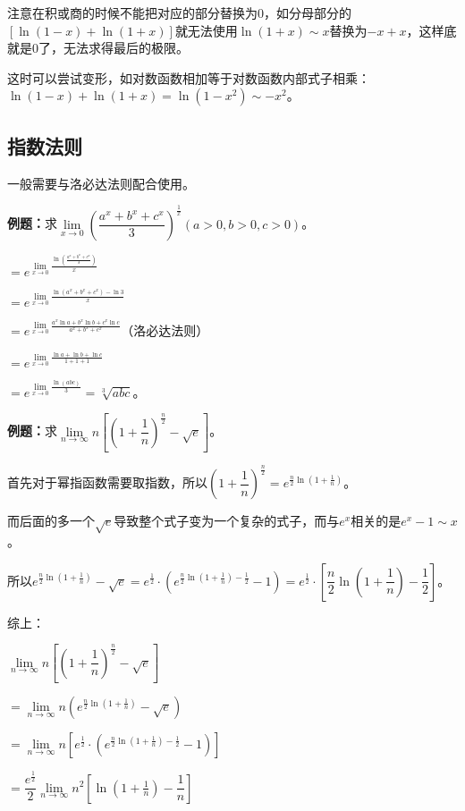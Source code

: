 \documentclass[UTF8, 12pt]{ctexart}
\begin{document}
注意在积或商的时候不能把对应的部分替换为0，如分母部分的$[\ln(1-x)+\ln(1+x)]$就无法使用$\ln(1+x)\sim x$替换为$-x+x$，这样底就是0了，无法求得最后的极限。

这时可以尝试变形，如对数函数相加等于对数函数内部式子相乘：$\ln(1-x)+\ln(1+x)=\ln(1-x^2)\sim-x^2$。

\subsection{指数法则}

一般需要与洛必达法则配合使用。

\textbf{例题：}求$\lim\limits_{x\to 0}\left(\dfrac{a^x+b^x+c^x}{3}\right)^{\frac{1}{x}}(a>0,b>0,c>0)$。\medskip

$=e^{\lim\limits_{x\to 0}\frac{\ln\left(\frac{a^x+b^x+c^x}{3}\right)}{x}}$

$=e^{\lim\limits_{x\to 0}\frac{\ln(a^x+b^x+c^x)-\ln 3}{x}}$

$=e^{\lim\limits_{x\to 0}\frac{a^x\ln a+b^x\ln b+c^x\ln c}{a^x+b^x+c^x}}$（洛必达法则）

$=e^{\lim\limits_{x\to 0}\frac{\ln a+\ln b+\ln c}{1+1+1}}$

$=e^{\lim\limits_{x\to 0}\frac{\ln(abc)}{3}}=\sqrt[3]{abc}$。

\textbf{例题：}求$\lim\limits_{n\to\infty}n\left[\left(1+\dfrac{1}{n}\right)^{\frac{n}{2}}-\sqrt{e}\right]$。

首先对于幂指函数需要取指数，所以$\left(1+\dfrac{1}{n}\right)^{\frac{n}{2}}=e^{\frac{n}{2}\ln(1+\frac{1}{n})}$。\medskip

而后面的多一个$\sqrt{e}$导致整个式子变为一个复杂的式子，而与$e^x$相关的是$e^x-1\sim x$。

所以$e^{\frac{n}{2}\ln(1+\frac{1}{n})}-\sqrt{e}=e^{\frac{1}{2}}\cdot\left(e^{\frac{n}{2}\ln(1+\frac{1}{n})-\frac{1}{2}}-1\right)=e^{\frac{1}{2}}\cdot\left[\dfrac{n}{2}\ln(1+\dfrac{1}{n})-\dfrac{1}{2}\right]$。

综上：

$\lim\limits_{n\to\infty}n\left[\left(1+\dfrac{1}{n}\right)^{\frac{n}{2}}-\sqrt{e}\right]$ \medskip

$=\lim\limits_{n\to\infty}n\left(e^{\frac{n}{2}\ln(1+\frac{1}{n})}-\sqrt{e}\right)$ \medskip

$=\lim\limits_{n\to\infty}n\left[e^{\frac{1}{2}}\cdot\left(e^{\frac{n}{2}\ln(1+\frac{1}{n})-\frac{1}{2}}-1\right)\right]$ \medskip

$=\dfrac{e^{\frac{1}{2}}}{2}\lim\limits_{n\to\infty}n^2\left[\ln\left(1+\frac{1}{n}\right)-\dfrac{1}{n}\right]$
\end{document}

